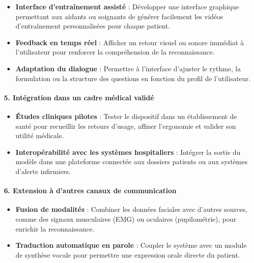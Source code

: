 \documentclass[
]{article}
\begin{document}
\begin{itemize}
\item
  \textbf{Interface d'entraînement assisté} : Développer une interface graphique permettant aux aidants ou soignants de générer facilement les vidéos d'entraînement personnalisées pour chaque patient.
\item
  \textbf{Feedback en temps réel} : Afficher un retour visuel ou sonore immédiat à l'utilisateur pour renforcer la compréhension de la reconnaissance.
\item
  \textbf{Adaptation du dialogue} : Permettre à l'interface d'ajuster le rythme, la formulation ou la structure des questions en fonction du profil de l'utilisateur.
\end{itemize}

\hypertarget{intuxe9gration-dans-un-cadre-muxe9dical-validuxe9}{%
\paragraph{\texorpdfstring{\textbf{5. Intégration dans un cadre médical validé}}{5. Intégration dans un cadre médical validé}}\label{intuxe9gration-dans-un-cadre-muxe9dical-validuxe9}}

\begin{itemize}
\item
  \textbf{Études cliniques pilotes} : Tester le dispositif dans un établissement de santé pour recueillir les retours d'usage, affiner l'ergonomie et valider son utilité médicale.
\item
  \textbf{Interopérabilité avec les systèmes hospitaliers} : Intégrer la sortie du modèle dans une plateforme connectée aux dossiers patients ou aux systèmes d'alerte infirmiers.
\end{itemize}

\hypertarget{extension-uxe0-dautres-canaux-de-communication}{%
\paragraph{\texorpdfstring{\textbf{6. Extension à d'autres canaux de communication}}{6. Extension à d'autres canaux de communication}}\label{extension-uxe0-dautres-canaux-de-communication}}

\begin{itemize}
\item
  \textbf{Fusion de modalités} : Combiner les données faciales avec d'autres sources, comme des signaux musculaires (EMG) ou oculaires (pupilométrie), pour enrichir la reconnaissance.
\item
  \textbf{Traduction automatique en parole} : Coupler le système avec un module de synthèse vocale pour permettre une expression orale directe du patient.
\end{itemize}
\end{document}
